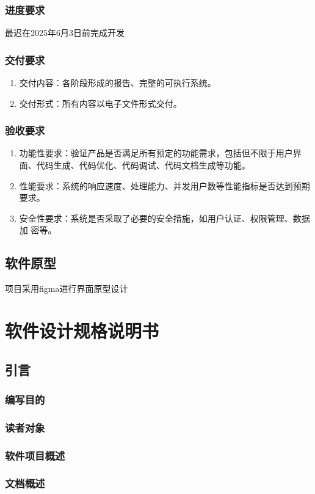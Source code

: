 \documentclass[
    report,     %
    oneside,    %
    UTF8,       %
    zihao=-4    %
]{config} %
\begin{document}
\subsection{进度要求}
最迟在2025年6月3日前完成开发
\subsection{交付要求}
\begin{enumerate}[label=(\arabic*)]
    \item 交付内容：各阶段形成的报告、完整的可执行系统。
    \item 交付形式：所有内容以电子文件形式交付。
\end{enumerate}
\subsection{验收要求}
\begin{enumerate}[label=(\arabic*)]
    \item 功能性要求：验证产品是否满足所有预定的功能需求，包括但不限于用户界面、代码生成、代码优化、代码调试、代码文档生成等功能。
    \item 性能要求：系统的响应速度、处理能力、并发用户数等性能指标是否达到预期要求。
    \item 安全性要求：系统是否采取了必要的安全措施，如用户认证、权限管理、数据加
    密等。
\end{enumerate}
\section{软件原型}
项目采用figma进行界面原型设计
\chapter{软件设计规格说明书}
\section{引言}
\subsection{编写目的}
\subsection{读者对象}
\subsection{软件项目概述}
\subsection{文档概述}
\end{document}
